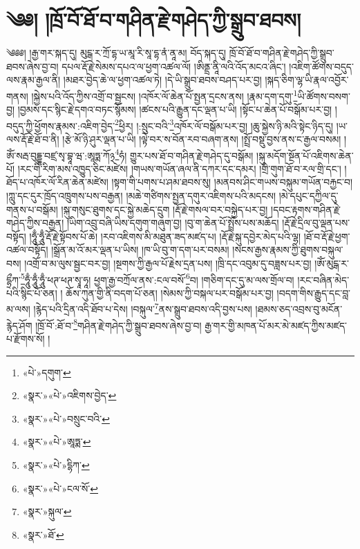 \chapter{༄༅། །ཁྲོ་བོ་ཐོ་བ་གཤིན་རྗེ་གཤེད་ཀྱི་སྒྲུབ་ཐབས།}༄༅༅། །རྒྱ་གར་སྐད་དུ། མུངྒ་ར་ཀྲོ་དྷ་ཡ་མཱ་རི་སཱ་དྷ་ནཾ་ནཱ་མ། བོད་སྐད་དུ། ཁྲོ་བོ་ཐོ་བ་གཤིན་རྗེ་གཤེད་ཀྱི་སྒྲུབ་ཐབས་ཞེས་བྱ་བ། དཔལ་རྡོ་རྗེ་སེམས་དཔའ་ལ་ཕྱག་འཚལ་ལོ། །ཨིནྡྲ་ནཱི་ལའི་འོད་མངའ་ཞིང་། །འཇིག་ཚོགས་བདུད་ལས་རྣམ་རྒྱལ་ནི། །མཐར་བྱེད་ཆེ་ལ་ཕྱག་འཚལ་ཏེ། །དེ་ཡི་སྒྲུབ་ཐབས་བཤད་པར་བྱ། །སྐད་ཅིག་ལྷ་ཡི་རྣལ་འབྱོར་གནས། །སྐྱེས་པའི་འོད་ཀྱིས་འགྲོ་བ་སྦྱངས། །འཁོར་ལོ་ཆེན་པོ་སྤྱན་དྲངས་ནས། །རྣམ་དག་དགུ་\footnote{«པེ་»དགུག་}ཡི་ཚོགས་བསག་བྱ། །བྱམས་དང་སྙིང་རྗེ་དགའ་བཏང་སྙོམས། །ཚངས་པའི་རྒྱུན་དང་ལྡན་པ་ཡི། །སྟོང་པ་ཆེན་པོ་བསྒོམ་པར་བྱ། །བདུད་ཀྱི་ཕྱོགས་རྣམས་:འཇིག་བྱེད་\footnote{«སྣར་»«པེ་»འཇིགས་བྱེད་}ཕྱིར། །:སྲུང་བའི་\footnote{«སྣར་»«པེ་»བསྲུང་བའི་}འཁོར་ལོ་བསྒོམ་པར་བྱ། །ཆུ་སྐྱེས་ཉི་མའི་སྟེང་ཉིད་དུ། །ཡ་ལས་རྡོ་རྗེ་ཐོ་བ་ནི། །རྩེ་མོ་ཉི་ཤུར་ལྡན་པ་ཡི། །ལྟེ་བར་ས་བོན་རབ་བཞག་ནས། །སྤྲོ་བསྡུ་བྱས་ནས་ང་རྒྱལ་བསམ། །ཨོཾ་སརྦ་བུདྡྷ་བཛྲ་སྭ་བྷཱ་ཝ་:ཨཱཏྨ་ཀོ྅\footnote{«སྣར་»«པེ་»ཨཱཏྨ་}ཧཾ། གྱུར་པས་ཐོ་བ་གཤིན་རྗེ་གཤེད་དུ་བསྒོམ། །སྐུ་མདོག་སྔོན་པོ་འཇིགས་ཆེན་པོ། །རང་གི་རིག་མས་འཁྱུད་ཅིང་མཛེས། །གཡས་གཡོན་ཞལ་ནི་དཀར་དང་དམར། །གྲི་གུག་ཐོ་བ་རལ་གྲི་དང་། །ཐོད་པ་འཁོར་ལོ་རིན་ཆེན་མཛེས། །སྟག་གི་པགས་པ་ཤམ་ཐབས་སུ། །མནབས་ཤིང་གཡས་བསྐུམ་གཡོན་བརྐྱང་བ། །ཀླུ་དང་དུར་ཁྲོད་འཁྲུགས་པས་བརྒྱན། །མཆེ་གཙིགས་སྤྱན་དགུར་འཇིགས་པའི་མདངས། །མེ་དཔུང་དཀྱིལ་དུ་གནས་པ་བསྒོམ། །སྐུ་གསུང་ཐུགས་དང་སྐྱེ་མཆེད་དྲུག །རྡོ་རྗེ་གསལ་བར་བསྐྱེད་པར་བྱ། །དབང་རྟགས་གཤིན་རྗེ་གཤེད་ཀྱིས་བརྒྱན། །ཡིག་འབྲུ་བཞི་ཡིས་དགུག་གཞུག་བྱ། །བུ་ག་ཆེན་པོ་སྤྲོས་པས་མཆོད། །རྡོ་རྗེ་དྲིལ་བུ་ལྡན་པས་བསྟོད། །ཧཱུྃ་ཧཱུྃ་རྡོ་རྗེ་སྟོབས་པོ་ཆེ། །རབ་འཇིགས་མི་མཐུན་ཟད་མཛད་པ། །རྡོ་རྗེ་སྐུ་དབྱེར་མེད་པའི་ལྷ། །ཐོ་བ་རྡོ་རྗེ་ཕྱག་འཚལ་བསྟོད། །སྒྲོན་མ་འོ་མར་ལྡན་པ་ཡིས། །ཁ་ཡི་བུ་ག་དག་པར་བསམ། །སངས་རྒྱས་རྣམས་ཀྱི་ཐུགས་བསྐུལ་བས། །འགྲོ་བ་མ་ལུས་སྦྱང་བར་བྱ། །སྔགས་ཀྱི་རྒྱལ་པོ་རྗེས་དྲན་པས། །ཁྲི་དང་འབུམ་དུ་བཟླས་པར་བྱ། །ཨོཾ་མུངྒ་ར་དྷྲྀཀ་\footnote{«སྣར་»«པེ་»དྷིཀ་}ཧཱུྃ་ཧཱུྃ་ཧཱུྃ་ཕཊ་ཕཊ་སྭཱ་ཧཱ། ཕྱག་རྒྱ་བཀྲོལ་ནས་:ངལ་བསོ་\footnote{«སྣར་»«པེ་»ངལ་སོ་}བ། །གཅིག་དང་དུ་མ་ལས་གྲོལ་བ། །རང་བཞིན་མེད་པའི་སྙིང་པོ་ཅན། །
ཆོས་ཀུན་གྱི་ནི་བདག་པོ་ཅན། །སེམས་ཀྱི་བསྐལ་པར་བསྒོམ་པར་བྱ། །བདག་གིས་རྒྱུད་དང་བླ་མ་ལས། །རྙེད་པའི་དྲིན་འདི་ཐོབ་པ་དེས། །བསྐུལ་\footnote{«སྣར་»སྐུལ་}ནས་སྒྲུབ་ཐབས་འདི་བྱས་པས། །ཐམས་ཅད་འབྲས་བུ་མངོན་རྙེད་ཤོག །ཁྲོ་བོ་:ཐོ་བ་\footnote{«སྣར་»ཐོ་}གཤིན་རྗེ་གཤེད་ཀྱི་སྒྲུབ་ཐབས་ཞེས་བྱ་བ། རྒྱ་གར་གྱི་མཁན་པོ་མར་མེ་མཛད་ཀྱིས་མཛད་པ་རྫོགས་སོ། ། 
